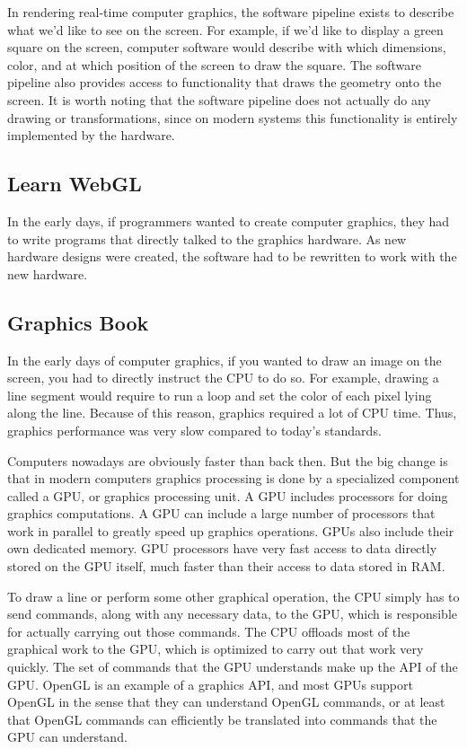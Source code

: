 In rendering real-time computer graphics, the software pipeline exists to
describe what we'd like to see on the screen. For example, if we'd like to display
a green square on the screen, computer software would describe with which
dimensions, color, and at which position of the screen to draw the square.
The software pipeline also provides access to functionality that draws the
geometry onto the screen. It is worth noting that the software pipeline does
not actually do any drawing or transformations, since on modern systems this
functionality is entirely implemented by the hardware.

\subsection{Learn WebGL}

In the early days, if programmers wanted to create computer graphics, they had to
write programs that directly talked to the graphics hardware.
As new hardware designs were created, the software had to be rewritten to
work with the new hardware.

\subsection{Graphics Book}

In the early days of computer graphics, if you wanted to draw an image on the
screen, you had to directly instruct the CPU to do so.
For example, drawing a line segment would require to run a loop and set the
color of each pixel lying along the line.
Because of this reason, graphics required a lot of CPU time.
Thus, graphics performance was very slow compared to today's standards.

Computers nowadays are obviously faster than back then.
But the big change is that in modern computers graphics processing is done
by a specialized component called a GPU, or graphics processing unit.
A GPU includes processors for doing graphics computations.
A GPU can include a large number of processors that work in parallel
to greatly speed up graphics operations.
GPUs also include their own dedicated memory.
GPU processors have very fast access to data directly stored on the GPU itself,
much faster than their access to data stored in RAM.

To draw a line or perform some other graphical operation, the CPU simply
has to send commands, along with any necessary data, to the GPU, which is
responsible for actually carrying out those commands. The CPU offloads most
of the graphical work to the GPU, which is optimized to carry out that work
very quickly. The set of commands that the GPU understands make up the API
of the GPU. OpenGL is an example of a graphics API, and most GPUs support
OpenGL in the sense that they can understand OpenGL commands, or at least
that OpenGL commands can efficiently be translated into commands that the
GPU can understand.

